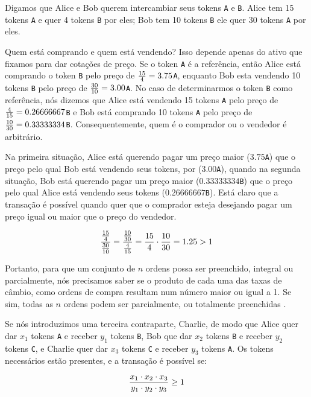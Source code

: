 \documentclass[UTF8,nofonts]{article}
\begin{document}
\begin{multicols}{2}
Digamos que Alice e Bob querem intercambiar seus tokens \verb|A| e \verb|B|. Alice tem 15 tokens \verb|A| e quer 4 tokens \verb|B| por eles; Bob tem 10 tokens \verb|B| ele quer 30 tokens \verb|A| por eles.

Quem está comprando e quem está vendendo? Isso depende apenas do ativo que fixamos para dar cotações de preço. Se o token \verb|A| é a referência, então Alice está comprando o token \verb|B| pelo preço de ${15 \over 4} = 3.75$\verb|A|, enquanto Bob esta vendendo 10 tokens \verb|B| pelo preço de ${30 \over 10} = 3.00$\verb|A|. No caso de determinarmos o token \verb|B| como referência, nós dizemos que Alice está vendendo 15 tokens \verb|A| pelo preço de ${4\over 15}=0.26666667$\verb|B| e Bob está comprando 10 tokens \verb|A| pelo preço de ${10 \over 30}=0.33333334$\verb|B|. Consequentemente, quem é o comprador ou o vendedor é arbitrário.

Na primeira situação, Alice está querendo pagar um preço maior ($3.75$\verb|A|) que o preço pelo qual Bob está vendendo seus tokens, por ($3.00$\verb|A|), quando na segunda situação, Bob está querendo pagar um preço maior ($0.33333334$\verb|B|) que o preço pelo qual Alice está vendendo seus tokens ($0.26666667$\verb|B|). Está claro que a transação é possível quando quer que o comprador esteja desejando pagar um preço igual ou maior que o preço do vendedor.

\begin{equation}
{{15\over 4} \over {30\over 10}} = {{10\over 30} \over {4\over 15}}={15 \over 4} \cdot {10 \over 30} = 1.25 > 1
\end{equation}

Portanto, para que um conjunto de $n$ ordens possa ser preenchido, integral ou parcialmente, nós precisamos saber se o produto de cada uma das taxas de câmbio, como ordens de compra resultam num número maior ou igual a 1. Se sim, todas as $n$ ordens podem ser parcialmente, ou totalmente preenchidas \cite{supersymmetry}.

Se nós introduzimos uma terceira contraparte, Charlie, de modo que Alice quer dar $x_1$ tokens \verb|A| e receber $y_1$  tokens \verb|B|, Bob que dar $x_2$ tokens \verb|B| e receber $y_2$ tokens \verb|C|, e Charlie quer dar $x_3$ tokens \verb|C| e receber $y_3$ tokens \verb|A|. Os tokens necessários estão presentes, e a transação é possível se: 

\begin{equation}
{{x_1 \cdot x_2 \cdot x_3 \over y_1 \cdot y_2 \cdot y_3} \geq 1}
\end{equation}


\end{multicols}
\end{document}
